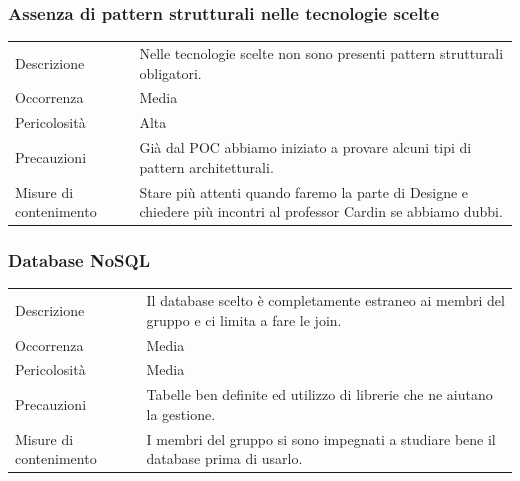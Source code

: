 \documentclass{article}
\begin{document}
\subsubsection{Assenza di pattern strutturali nelle tecnologie scelte}
\begin{center}
\begin{tabular}{P{10em} P{20em}} 
     Descrizione & Nelle tecnologie scelte non sono presenti pattern strutturali obligatori. \\ 
    Occorrenza & Media\\
    Pericolosità & Alta \\
    Precauzioni & Già dal POC abbiamo iniziato a provare alcuni tipi di pattern architetturali.\\
    Misure di contenimento & Stare più attenti quando faremo la parte di Designe e chiedere più incontri al professor Cardin se abbiamo dubbi. \\
\end{tabular}
\label{tab:esptec}
\end{center}

\subsubsection{Database NoSQL}
\begin{center}
\begin{tabular}{P{10em} P{20em}} 
     Descrizione & Il database scelto è completamente estraneo ai membri del gruppo e ci limita a fare le join. \\ 
    Occorrenza & Media\\
    Pericolosità & Media \\
    Precauzioni & Tabelle ben definite ed utilizzo di librerie che ne aiutano la gestione.\\
    Misure di contenimento & I membri del gruppo si sono impegnati a studiare bene il database prima di usarlo. \\
\end{tabular}
\label{tab:esptec}
\end{center}
\end{document}
